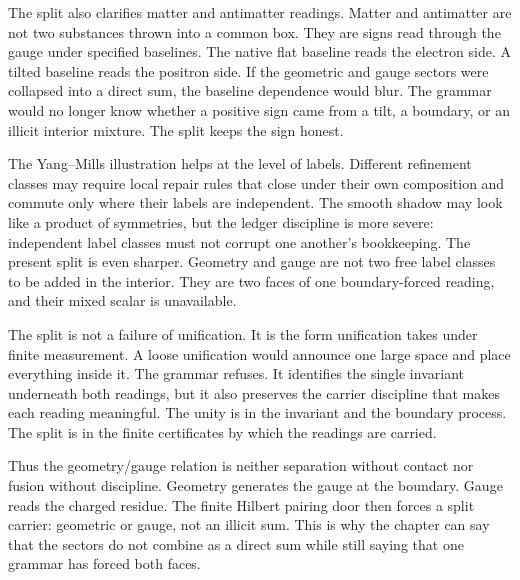 The split also clarifies matter and antimatter readings. Matter and
antimatter are not two substances thrown into a common box. They are signs
read through the gauge under specified baselines. The native flat baseline
reads the electron side. A tilted baseline reads the positron side. If the
geometric and gauge sectors were collapsed into a direct sum, the baseline
dependence would blur. The grammar would no longer know whether a positive
sign came from a tilt, a boundary, or an illicit interior mixture. The split
keeps the sign honest.

The Yang--Mills illustration helps at the level of labels. Different
refinement classes may require local repair rules that close under their own
composition and commute only where their labels are independent. The smooth
shadow may look like a product of symmetries, but the ledger discipline is
more severe: independent label classes must not corrupt one another's
bookkeeping. The present split is even sharper. Geometry and gauge are not
two free label classes to be added in the interior. They are two faces of one
boundary-forced reading, and their mixed scalar is unavailable.

The split is not a failure of unification. It is the form unification takes
under finite measurement. A loose unification would announce one large space
and place everything inside it. The grammar refuses. It identifies the
single invariant underneath both readings, but it also preserves the carrier
discipline that makes each reading meaningful. The unity is in the invariant
and the boundary process. The split is in the finite certificates by which
the readings are carried.

Thus the geometry/gauge relation is neither separation without contact nor
fusion without discipline. Geometry generates the gauge at the boundary.
Gauge reads the charged residue. The finite Hilbert pairing door then forces
a split carrier: geometric or gauge, not an illicit sum. This is why the
chapter can say that the sectors do not combine as a direct sum while still
saying that one grammar has forced both faces.

